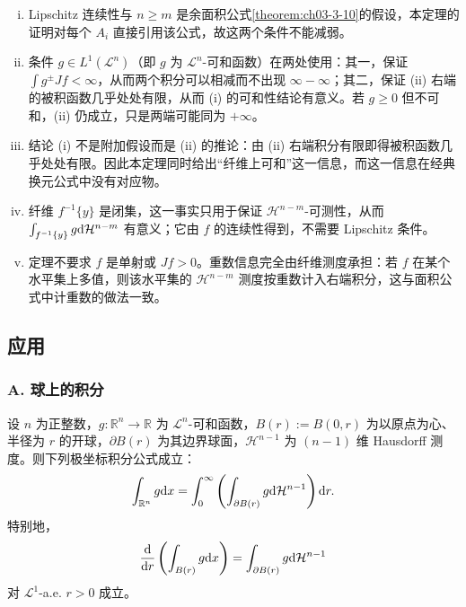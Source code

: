 \documentclass[../../main.tex]{subfiles}%
\begin{document}
\begin{remark}\label{remark:ch03-thm-3-11-条件}
\begin{enumerate}[(i)]
\item Lipschitz 连续性与 $n\geqslant m$ 是余面积公式\cref{theorem:ch03-3-10}的假设，本定理的证明对每个 $A_i$ 直接引用该公式，故这两个条件不能减弱。%
\item 条件 $g\in L^1(\mathcal{L}^n)$（即 $g$ 为 $\mathcal{L}^n$-可和函数）在两处使用：其一，保证 $\int g^{\pm}Jf<\infty$，从而两个积分可以相减而不出现 $\infty-\infty$；其二，保证 (ii) 右端的被积函数几乎处处有限，从而 (i) 的可和性结论有意义。若 $g\geqslant0$ 但不可和，(ii) 仍成立，只是两端可能同为 $+\infty$。
\item 结论 (i) 不是附加假设而是 (ii) 的推论：由 (ii) 右端积分有限即得被积函数几乎处处有限。因此本定理同时给出“纤维上可和”这一信息，而这一信息在经典换元公式中没有对应物。
\item 纤维 $f^{-1}\{y\}$ 是闭集，这一事实只用于保证 $\mathcal{H}^{n-m}$-可测性，从而 $\int_{f^{-1}\{y\}}g\mathrm{d}\mathcal{H}^{n-m}$ 有意义；它由 $f$ 的连续性得到，不需要 Lipschitz 条件。
\item 定理不要求 $f$ 是单射或 $Jf>0$。重数信息完全由纤维测度承担：若 $f$ 在某个水平集上多值，则该水平集的 $\mathcal{H}^{n-m}$ 测度按重数计入右端积分，这与面积公式中计重数的做法一致。
\end{enumerate}
\end{remark}

\subsection{应用}\label{subsection:ch03-04-4}

\subsubsection*{A. 球上的积分}

\begin{theorem}[极坐标]\label{theorem:ch03-3-12}
设 $n$ 为正整数，$g:\mathbb{R}^n\to\mathbb{R}$ 为 $\mathcal{L}^n$-可和函数，$B(r):=B(0,r)$ 为以原点为心、半径为 $r$ 的开球，$\partial B(r)$ 为其边界球面，$\mathcal{H}^{n-1}$ 为 $(n-1)$ 维 Hausdorff 测度。则下列极坐标积分公式成立：
\begin{align*}
\int_{\mathbb{R}^n}g\mathrm{d} x=\int_0^{\infty}\left(\int_{\partial B(r)}g\mathrm{d}\mathcal{H}^{n-1}\right)\mathrm{d} r.
\end{align*}
特别地，
\begin{align*}
\frac{\mathrm{d}}{\mathrm{d} r}\left(\int_{B(r)}g\mathrm{d} x\right)=\int_{\partial B(r)}g\mathrm{d}\mathcal{H}^{n-1}
\end{align*}
对 $\mathcal{L}^1$-a.e. $r>0$ 成立。
\end{theorem}
\end{document}
